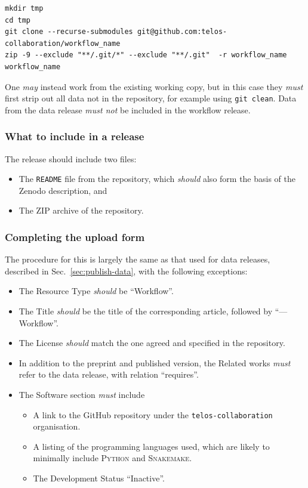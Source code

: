 \documentclass{article}
\newcommand\rfcword[1]{\emph{#1}\xspace}
\newcommand\must{\rfcword{must}}
\newcommand\mustnot{\rfcword{must not}}
\newcommand\should{\rfcword{should}}
\newcommand\may{\rfcword{may}}
\newcommand\filename[1]{\texttt{#1}\xspace}
\newcommand\readme{\filename{README}}
\newcommand\program[1]{\textsc{#1}\xspace}
\begin{document}
\begin{verbatim}
mkdir tmp
cd tmp
git clone --recurse-submodules git@github.com:telos-collaboration/workflow_name
zip -9 --exclude "**/.git/*" --exclude "**/.git"  -r workflow_name workflow_name
\end{verbatim}

One \may instead work from the existing working copy,
but in this case they \must first strip out all data not in the repository,
for example using \verb|git clean|.
Data from the data release \mustnot be included in the workflow release.

\subsubsection{What to include in a release}

The release should include two files:

\begin{itemize}
  \item
        The \readme file from the repository,
        which \should also form the basis of the Zenodo description, and
  \item
        The ZIP archive of the repository.
\end{itemize}

\subsubsection{Completing the upload form}

The procedure for this is largely the same as that used for data releases,
described in Sec.~\ref{sec:publish-data},
with the following exceptions:

\begin{itemize}
  \item
        The Resource Type \should be ``Workflow''.
  \item
        The Title \should be the title of the corresponding article,
        followed by ``---Workflow''.
  \item
        The License \should match the one agreed and specified in the repository.
  \item
        In addition to the preprint and published version,
        the Related works \must refer to the data release,
        with relation ``requires''.
  \item
        The Software section \must include
        \begin{itemize}
          \item
                A link to the GitHub repository under the \verb|telos-collaboration| organisation.
          \item
                A listing of the programming languages used,
                which are likely to minimally include
                \program{Python} and \program{Snakemake}.
          \item
                The Development Status ``Inactive''.
        \end{itemize}
\end{itemize}
\end{document}
